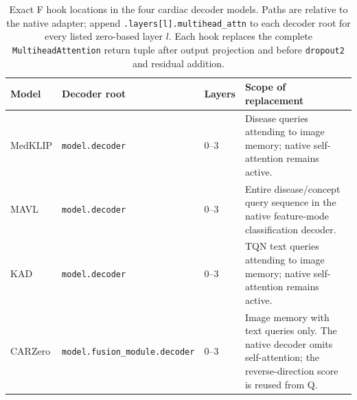 \begin{table}[t]
\centering
\small
\setlength{\tabcolsep}{5pt}
\begin{tabular}{@{}p{}p{}p{}p{}@{}}
\toprule
Model & Decoder root & Layers & Scope of replacement \\
\midrule
MedKLIP & \texttt{model.decoder} & 0--3 & Disease queries attending to image memory; native self-attention remains active. \\
MAVL & \texttt{model.decoder} & 0--3 & Entire disease/concept query sequence in the native feature-mode classification decoder. \\
KAD & \texttt{model.decoder} & 0--3 & TQN text queries attending to image memory; native self-attention remains active. \\
CARZero & \texttt{model.fusion\_module.}\newline\texttt{decoder} & 0--3 & Image memory with text queries only. The native decoder omits self-attention; the reverse-direction score is reused from Q. \\
\bottomrule
\end{tabular}
\caption{Exact F hook locations in the four cardiac decoder models. Paths are relative to the native adapter; append \texttt{.layers[l].multihead\_attn} to each decoder root for every listed zero-based layer $l$. Each hook replaces the complete \texttt{MultiheadAttention} return tuple after output projection and before \texttt{dropout2} and residual addition.}
\label{tab:supp-f-hooks}
\end{table}

